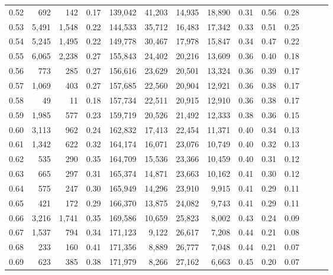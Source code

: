 \begin{tabular}{rrrrrrrrrrrrrr}
0.52 &     692 &    142 &  0.17 &  139,042 &   41,203 &  14,935 &  18,890 &  0.31 &  0.56 &      0.28 \\
0.53 &   5,491 &  1,548 &  0.22 &  144,533 &   35,712 &  16,483 &  17,342 &  0.33 &  0.51 &      0.25 \\
0.54 &   5,245 &  1,495 &  0.22 &  149,778 &   30,467 &  17,978 &  15,847 &  0.34 &  0.47 &      0.22 \\
0.55 &   6,065 &  2,238 &  0.27 &  155,843 &   24,402 &  20,216 &  13,609 &  0.36 &  0.40 &      0.18 \\
0.56 &     773 &    285 &  0.27 &  156,616 &   23,629 &  20,501 &  13,324 &  0.36 &  0.39 &      0.17 \\
0.57 &   1,069 &    403 &  0.27 &  157,685 &   22,560 &  20,904 &  12,921 &  0.36 &  0.38 &      0.17 \\
0.58 &      49 &     11 &  0.18 &  157,734 &   22,511 &  20,915 &  12,910 &  0.36 &  0.38 &      0.17 \\
0.59 &   1,985 &    577 &  0.23 &  159,719 &   20,526 &  21,492 &  12,333 &  0.38 &  0.36 &      0.15 \\
0.60 &   3,113 &    962 &  0.24 &  162,832 &   17,413 &  22,454 &  11,371 &  0.40 &  0.34 &      0.13 \\
0.61 &   1,342 &    622 &  0.32 &  164,174 &   16,071 &  23,076 &  10,749 &  0.40 &  0.32 &      0.13 \\
0.62 &     535 &    290 &  0.35 &  164,709 &   15,536 &  23,366 &  10,459 &  0.40 &  0.31 &      0.12 \\
0.63 &     665 &    297 &  0.31 &  165,374 &   14,871 &  23,663 &  10,162 &  0.41 &  0.30 &      0.12 \\
0.64 &     575 &    247 &  0.30 &  165,949 &   14,296 &  23,910 &   9,915 &  0.41 &  0.29 &      0.11 \\
0.65 &     421 &    172 &  0.29 &  166,370 &   13,875 &  24,082 &   9,743 &  0.41 &  0.29 &      0.11 \\
0.66 &   3,216 &  1,741 &  0.35 &  169,586 &   10,659 &  25,823 &   8,002 &  0.43 &  0.24 &      0.09 \\
0.67 &   1,537 &    794 &  0.34 &  171,123 &    9,122 &  26,617 &   7,208 &  0.44 &  0.21 &      0.08 \\
0.68 &     233 &    160 &  0.41 &  171,356 &    8,889 &  26,777 &   7,048 &  0.44 &  0.21 &      0.07 \\
0.69 &     623 &    385 &  0.38 &  171,979 &    8,266 &  27,162 &   6,663 &  0.45 &  0.20 &      0.07 \\

\end{tabular}
